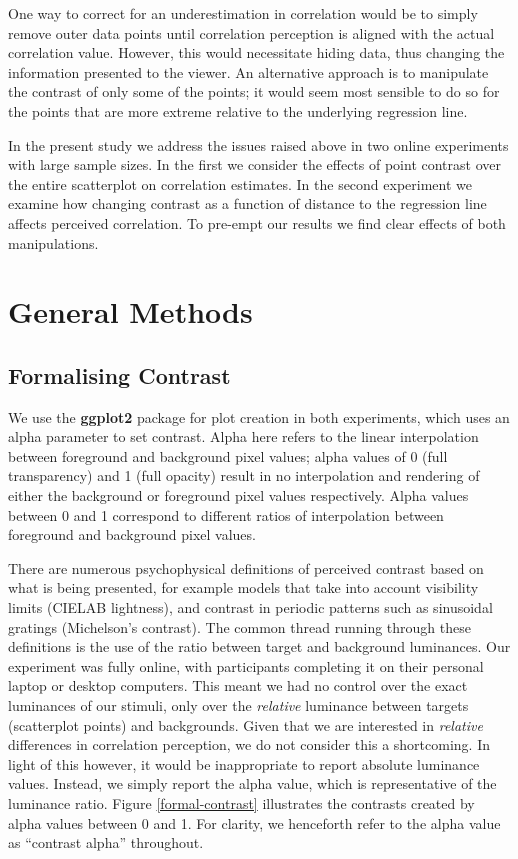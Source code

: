 \documentclass[preprint, 3p,
authoryear]{elsarticle} %
\begin{document}
One way to correct for an underestimation in correlation would be to
simply remove outer data points until correlation perception is aligned
with the actual correlation value. However, this would necessitate
hiding data, thus changing the information presented to the viewer. An
alternative approach is to manipulate the contrast of only some of the
points; it would seem most sensible to do so for the points that are
more extreme relative to the underlying regression line.

In the present study we address the issues raised above in two online
experiments with large sample sizes. In the first we consider the
effects of point contrast over the entire scatterplot on correlation
estimates. In the second experiment we examine how changing contrast as
a function of distance to the regression line affects perceived
correlation. To pre-empt our results we find clear effects of both
manipulations.

\hypertarget{general-methods}{%
\section{General Methods}\label{general-methods}}

\hypertarget{formalising-contrast}{%
\subsection{Formalising Contrast}\label{formalising-contrast}}

We use the \textbf{ggplot2} \citep{hadley_gg2016} package for plot
creation in both experiments, which uses an alpha parameter to set
contrast. Alpha here refers to the linear interpolation
\citep{stone_2008} between foreground and background pixel values; alpha
values of 0 (full transparency) and 1 (full opacity) result in no
interpolation and rendering of either the background or foreground pixel
values respectively. Alpha values between 0 and 1 correspond to
different ratios of interpolation between foreground and background
pixel values.

There are numerous psychophysical definitions of perceived contrast
\citep{zuffi_2007} based on what is being presented, for example models
that take into account visibility limits (CIELAB lightness), and
contrast in periodic patterns such as sinusoidal gratings (Michelson's
contrast). The common thread running through these definitions is the
use of the ratio between target and background luminances. Our
experiment was fully online, with participants completing it on their
personal laptop or desktop computers. This meant we had no control over
the exact luminances of our stimuli, only over the \emph{relative}
luminance between targets (scatterplot points) and backgrounds. Given
that we are interested in \emph{relative} differences in correlation
perception, we do not consider this a shortcoming. In light of this
however, it would be inappropriate to report absolute luminance values.
Instead, we simply report the alpha value, which is representative of
the luminance ratio. Figure \ref{formal-contrast} illustrates the
contrasts created by alpha values between 0 and 1. For clarity, we
henceforth refer to the alpha value as ``contrast alpha'' throughout.
\end{document}
